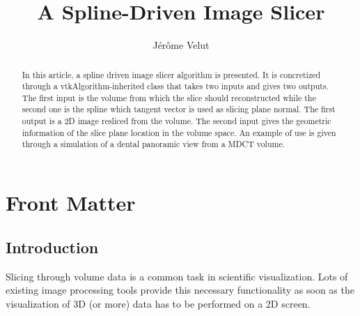 \documentclass{InsightArticle}
\title{A Spline-Driven Image Slicer}
\author{J\'er\^ome Velut}
\newcommand{\IJhandlerIDnumber}{3318}
\begin{document}
%
% 
\IJhandlefooter{\IJhandlerIDnumber}


\ifpdf
\else
\fi


\maketitle


\ifhtml
\chapter*{Front Matter\label{front}}
\fi


\begin{abstract}
\noindent
In this article, a spline driven image slicer algorithm is presented. It is
concretized through a vtkAlgorithm-inherited class that takes two inputs and
gives two outputs. The first input is the volume from which the slice should
reconstructed while the second one is the spline which tangent vector is used as
slicing plane normal. The first output is a 2D image resliced from the volume.
The second input gives the geometric information of the slice plane location in
the volume space. An example of use is given through a simulation of a dental
panoramic view from a MDCT volume.
\end{abstract}

\IJhandlenote{\IJhandlerIDnumber}

\tableofcontents
%
\section*{Introduction}
%
Slicing through volume data is a common task in scientific visualization. Lots
of existing image processing tools provide this necessary functionality as soon
as the visualization of 3D (or more) data has to be performed on a 2D screen.
\end{document}
